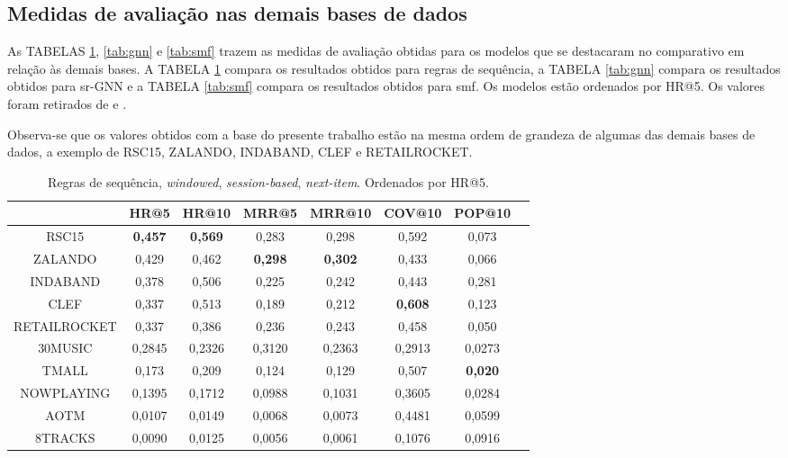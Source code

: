 \subsection{Medidas de avaliação nas demais bases de dados}
As TABELAS \ref{tab:sr}, \ref{tab:gnn} e \ref{tab:smf} trazem as medidas de
avaliação obtidas para os modelos que se destacaram no comparativo em relação às
demais bases. A TABELA \ref{tab:sr} compara os resultados obtidos para regras de
sequência, a TABELA \ref{tab:gnn} compara os resultados obtidos para sr-GNN e a
TABELA \ref{tab:smf} compara os resultados obtidos para smf. Os modelos estão
ordenados por HR@5. Os valores foram retirados de \citet{ludewig2020advances} e
\citet{shehzad2024performance}.

Observa-se que os valores obtidos com a base do presente trabalho estão na mesma
ordem de grandeza de algumas das demais bases de dados, a exemplo de RSC15,
ZALANDO, INDABAND, CLEF e RETAILROCKET.

\begin{table}
\centering
\vspace{1mm}
\begin{tabular}{cccccccc}
\hline
 & HR@5 & HR@10 & MRR@5 & MRR@10 & COV@10 & POP@10 \\
\hline
RSC15&  \textbf{0,457} & \textbf{0,569} & 0,283 & 0,298 & 0,592 & 0,073 \\
ZALANDO  & 0,429 & 0,462 & \textbf{0,298} & \textbf{0,302} & 0,433 & 0,066 \\
INDABAND & 0,378 & 0,506 & 0,225 & 0,242 & 0,443 & 0,281 \\
CLEF& 0,337 & 0,513 & 0,189 & 0,212 & \textbf{0,608} & 0,123 \\
RETAILROCKET&  0,337 & 0,386 & 0,236 & 0,243 & 0,458 & 0,050 \\
30MUSIC& 0,2845 & 0,2326 & 0,3120  & 0,2363 & 0,2913 & 0,0273 \\
TMALL& 0,173 & 0,209 & 0,124 & 0,129 & 0,507 & \textbf{0,020} \\
NOWPLAYING& 0,1395 & 0,1712 & 0,0988 & 0,1031 & 0,3605 & 0,0284 \\
AOTM& 0,0107 & 0,0149 & 0,0068 & 0,0073 & 0,4481 & 0,0599 \\
8TRACKS& 0,0090 & 0,0125 & 0,0056 & 0,0061 & 0,1076 & 0,0916 \\
\hline
\end{tabular}
\caption{Regras de sequência, \textit{windowed}, \textit{session-based}, \textit{next-item}. Ordenados por HR@5.}
\label{tab:sr}
\end{table}

